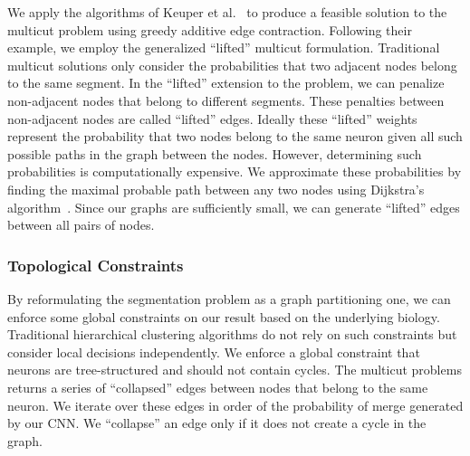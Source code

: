 We apply the algorithms of Keuper et al.~\cite{keuper2015efficient} to produce a feasible solution to the multicut problem using greedy additive edge contraction.
Following their example, we employ the generalized ``lifted'' multicut formulation.
Traditional multicut solutions only consider the probabilities that two adjacent nodes belong to the same segment. 
In the ``lifted'' extension to the problem, we can penalize non-adjacent nodes that belong to different segments. 
These penalties between non-adjacent nodes are called ``lifted'' edges. 
Ideally these ``lifted'' weights represent the probability that two nodes belong to the same neuron given all such possible paths in the graph between the nodes.
However, determining such probabilities is computationally expensive.
We approximate these probabilities by finding the maximal probable path between any two nodes using Dijkstra's algorithm~\cite{keuper2015efficient}.
Since our graphs are sufficiently small, we can generate ``lifted'' edges between all pairs of nodes. 

\subsubsection{Topological Constraints}

By reformulating the segmentation problem as a graph partitioning one, we can enforce some global constraints on our result based on the underlying biology.
Traditional hierarchical clustering algorithms do not rely on such constraints but consider local decisions independently.
We enforce a global constraint that neurons are tree-structured and should not contain cycles. 
The multicut problems returns a series of ``collapsed'' edges between nodes that belong to the same neuron.
We iterate over these edges in order of the probability of merge generated by our CNN. 
We ``collapse'' an edge only if it does not create a cycle in the graph.
